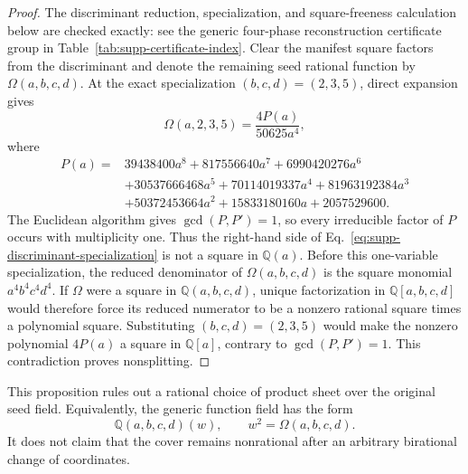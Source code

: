 \begin{proof}
The discriminant reduction, specialization, and square-freeness calculation below are checked exactly: see the generic four-phase reconstruction certificate group in Table~\ref{tab:supp-certificate-index}.
Clear the manifest square factors from the discriminant and denote the remaining seed rational function by $\Omega(a,b,c,d)$.  At the exact specialization $(b,c,d)=(2,3,5)$, direct expansion gives
\begin{equation}
\Omega(a,2,3,5)=\frac{4P(a)}{50625a^4},
\label{eq:supp-discriminant-specialization}
\end{equation}
where
\begin{equation}
\begin{aligned}
P(a)={}&39438400a^8+817556640a^7+6990420276a^6\\
&+30537666468a^5+70114019337a^4+81963192384a^3\\
&+50372453664a^2+15833180160a+2057529600.
\end{aligned}
\label{eq:supp-discriminant-polynomial}
\end{equation}
The Euclidean algorithm gives $\gcd(P,P')=1$, so every irreducible factor of $P$ occurs with multiplicity one.  Thus the right-hand side of Eq.~\eqref{eq:supp-discriminant-specialization} is not a square in $\mathbb Q(a)$.  Before this one-variable specialization, the reduced denominator of $\Omega(a,b,c,d)$ is the square monomial $a^4b^4c^4d^4$.  If $\Omega$ were a square in $\mathbb Q(a,b,c,d)$, unique factorization in $\mathbb Q[a,b,c,d]$ would therefore force its reduced numerator to be a nonzero rational square times a polynomial square.  Substituting $(b,c,d)=(2,3,5)$ would make the nonzero polynomial $4P(a)$ a square in $\mathbb Q[a]$, contrary to $\gcd(P,P')=1$.  This contradiction proves nonsplitting.
\end{proof}

{This proposition rules out a rational choice of product sheet over the original seed field. Equivalently, the generic function field has the form}
\begin{equation}
{\mathbb Q(a,b,c,d)(w),\qquad w^2=\Omega(a,b,c,d).}
\label{eq:supp-double-cover-field}
\end{equation}
{It does not claim that the cover remains nonrational after an arbitrary birational change of coordinates.}

